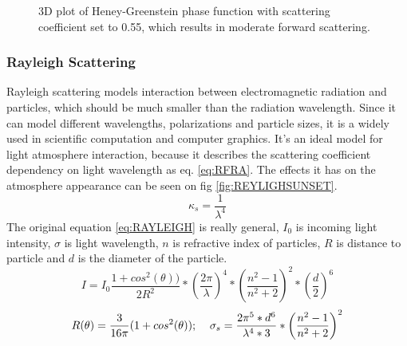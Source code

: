 \begin{minipage}{\linewidth}
\begin{minipage}{0.45\linewidth}
\begin{figure}[H]
              \captionsetup{width=\linewidth}
              \caption[3D plot Heney-Greenstein]{3D plot of Heney-Greenstein phase function with scattering coefficient set to 0.55, which results in moderate forward scattering. }\label{fig:HG3}
          \end{figure}
      \end{minipage}
  \end{minipage}
\clearpage{}

\subsubsection{Rayleigh Scattering}
\label{lab:REY}
Rayleigh scattering models interaction between electromagnetic radiation and particles, which should be much smaller than the radiation wavelength. Since it can model different wavelengths, polarizations and particle sizes, it is a widely used in scientific computation and computer graphics. It's an ideal model for light atmosphere interaction, because it describes the scattering coefficient dependency on light wavelength as eq. \ref{eq:RFRA}. The effects it has on the atmosphere appearance can be seen on fig \ref{fig:REYLIGHSUNSET}.
\begin{equation}
\label{eq:RFRA}
\kappa_{s}=\frac{1}{\lambda^{4}} 
\end{equation}
The original equation \ref{eq:RAYLEIGH} is really general, $I_0$ is incoming light intensity, $\sigma$ is light wavelength, $n$ is refractive index of particles, $R$ is distance to particle and $d$ is the diameter of the particle. 
\begin{equation}
\label{eq:RAYLEIGH}
I=I_{0}\frac{1+cos^{2}(\theta))}{2R^2}*\left(\frac{2\pi}{\lambda}\right)^{4}*\left(\frac{n^{2}-1}{n^{2}+2}\right)^2*\left(\frac{d}{2}\right)^6
\end{equation}
\begin{equation}
\label{eq:RAYLEIGH2}
R(\theta)=\frac{3}{16\pi}(1+cos^{2}(\theta)); \text{\;\;\;\;} \sigma_{s}=\frac{2\pi^{5}*d^{6}}{\lambda^{4}*3}*\left(\frac{n^{2}-1}{n^{2}+2}\right)^2
\end{equation}

